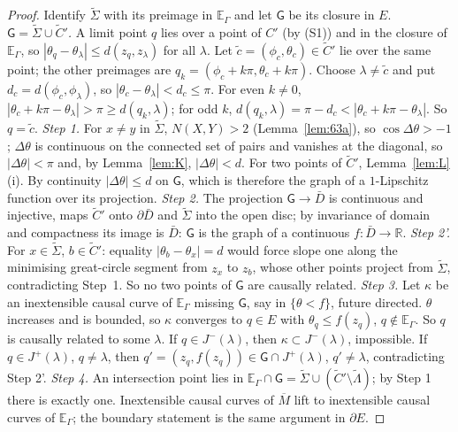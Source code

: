 \documentclass[aps,prd,onecolumn,superscriptaddress,nofootinbib,amsmath,amssymb,11pt]{revtex4-2}
\theoremstyle{definition}
\newcommand{\R}{\mathbb{R}}
\newcommand{\Mbar}{\overline{M}}
\newcommand{\EG}{\mathbb{E}_\Gamma}
\begin{document}
\begin{proof}
Identify $\tilde\Sigma$ with its preimage in $\EG$ and let $\mathsf G$ be its closure in $E$.
\emph{$\mathsf G=\tilde\Sigma\cup\tilde C'$.} A limit point $q$ lies over a point of $C'$ (by (S1)) and in the closure of $\EG$,
so $|\theta_q-\theta_\lambda|\le d(z_q,z_\lambda)$ for all $\lambda$. Let $\tilde c=(\phi_c,\theta_c)\in\tilde C'$ lie over the same
point; the other preimages are $q_k=(\phi_c+k\pi,\theta_c+k\pi)$. Choose $\lambda\ne\tilde c$ and put $d_c=d(\phi_c,\phi_\lambda)$, so
$|\theta_c-\theta_\lambda|<d_c\le\pi$. For even $k\ne0$, $|\theta_c+k\pi-\theta_\lambda|>\pi\ge d(q_k,\lambda)$; for odd $k$,
$d(q_k,\lambda)=\pi-d_c<|\theta_c+k\pi-\theta_\lambda|$. So $q=\tilde c$.
\emph{Step 1.} For $x\ne y$ in $\tilde\Sigma$, $N(X,Y)>2$ (Lemma~\ref{lem:63a}), so $\cos\Delta\theta>-1$; $\Delta\theta$ is continuous on
the connected set of pairs and vanishes at the diagonal, so $|\Delta\theta|<\pi$ and, by Lemma~\ref{lem:K}, $|\Delta\theta|<d$. For
two points of $\tilde C'$, Lemma~\ref{lem:L}(i). By continuity $|\Delta\theta|\le d$ on $\mathsf G$, which is therefore the graph
of a $1$-Lipschitz function over its projection.
\emph{Step 2.} The projection $\mathsf G\to\bar D$ is continuous and injective, maps $\tilde C'$ onto $\partial\bar D$ and
$\tilde\Sigma$ into the open disc; by invariance of domain and compactness its image is $\bar D$: $\mathsf G$ is the graph of a
continuous $f:\bar D\to\R$.
\emph{Step 2'.} For $x\in\tilde\Sigma$, $b\in\tilde C'$: equality $|\theta_b-\theta_x|=d$ would force slope one along the minimising
great-circle segment from $z_x$ to $z_b$, whose other points project from $\tilde\Sigma$, contradicting Step~1. So no two
points of $\mathsf G$ are causally related.
\emph{Step 3.} Let $\kappa$ be an inextensible causal curve of $\EG$ missing $\mathsf G$, say in $\{\theta<f\}$, future
directed. $\theta$ increases and is bounded, so $\kappa$ converges to $q\in E$ with $\theta_q\le f(z_q)$, $q\notin\EG$. So $q$ is
causally related to some $\lambda$. If $q\in J^-(\lambda)$, then $\kappa\subset J^-(\lambda)$, impossible. If $q\in J^+(\lambda)$,
$q\ne\lambda$, then $q'=(z_q,f(z_q))\in\mathsf G\cap J^+(\lambda)$, $q'\ne\lambda$, contradicting Step 2'.
\emph{Step 4.} An intersection point lies in $\EG\cap\mathsf G=\tilde\Sigma\cup(\tilde C'\setminus\tilde\Lambda)$; by Step 1 there is
exactly one. Inextensible causal curves of $\Mbar$ lift to inextensible causal curves of $\EG$; the boundary statement is
the same argument in $\partial E$.
\end{proof}
\end{document}

